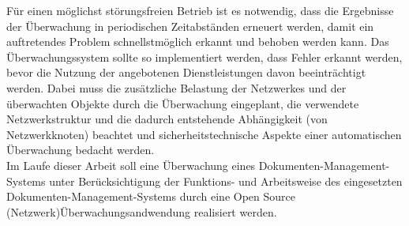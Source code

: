 Für einen möglichst störungsfreien Betrieb ist es notwendig, dass die Ergebnisse der Überwachung in periodischen Zeitabständen erneuert werden, damit ein auftretendes Problem schnellstmöglich erkannt und behoben werden kann.
Das Überwachungssystem sollte so implementiert werden, dass Fehler erkannt werden, bevor die Nutzung der angebotenen Dienstleistungen davon beeinträchtigt werden.
Dabei muss die zusätzliche Belastung der Netzwerkes und der überwachten Objekte durch die Überwachung eingeplant, die verwendete Netzwerkstruktur und die dadurch entstehende Abhängigkeit (von Netzwerkknoten) beachtet und sicherheitstechnische Aspekte einer automatischen Überwachung bedacht werden.\\


Im Laufe dieser Arbeit soll eine Überwachung eines Dokumenten-Management-Systems unter Berücksichtigung der Funktions- und Arbeitsweise des eingesetzten Dokumenten-Management-Systems durch eine Open Source (Netzwerk)Überwachungsandwendung realisiert werden.
 

